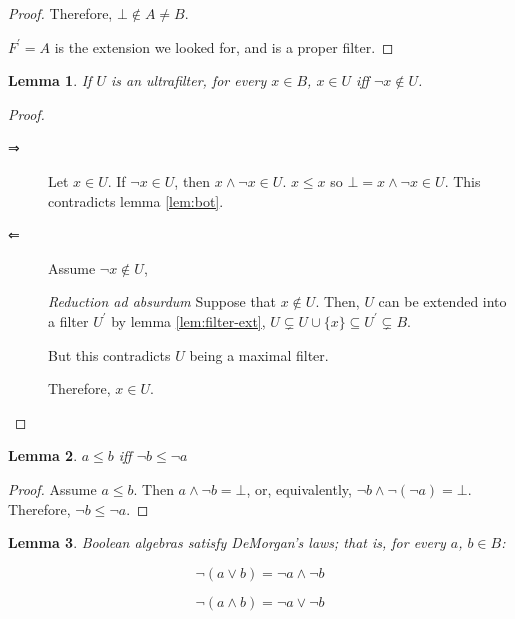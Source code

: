 \documentclass[notitlepage,a4paper]{article}
\newtheorem{lemma}{Lemma}
\begin{document}
\begin{enumerate}
\begin{proof}
           Therefore, $⊥ \not \in A ≠ B$.

           $F^\prime = A$ is the extension we looked for, and is a proper filter.
           
     \end{proof}
     
     \begin{lemma}\label{lem:neg}
       If $U$ is an ultrafilter, for every $x ∈ B$,
       $x ∈ U$ iff $¬x \not \in U$.
     \end{lemma}
     \begin{proof}

       \begin{description}
         
         \item[⇒] Let $x ∈ U$. If $¬x ∈ U$, then $x ∧ ¬x ∈ U$.
           $x ≤ x$ so $⊥ = x ∧ ¬x ∈ U$. This contradicts lemma \ref{lem:bot}.

         \item[⇐] Assume $¬x \not \in U$,

           {\em Reduction ad absurdum} Suppose that $x \not \in U$. Then,
           $U$ can be extended into a filter $U^\prime$ by lemma \ref{lem:filter-ext},
           $U \subsetneq U \cup \{x\} \subseteq U^\prime \subsetneq B$.
           
           But this contradicts $U$ being a maximal filter.
           
           Therefore, $x \in U$.
            
        \end{description}
    \end{proof}

     \begin{lemma}\label{lem:compl-rev}
       $a ≤ b$ iff $¬b ≤ ¬a$
     \end{lemma}
     \begin{proof}
       Assume $a ≤ b$. Then $a ∧ ¬b = ⊥$, or, equivalently,
       $¬b ∧ ¬(¬a) = ⊥$. Therefore, $¬b ≤ ¬a$.
     \end{proof}

     \begin{lemma}\label{lem:morgan}
       Boolean algebras satisfy DeMorgan's laws; that is, for every
       $a$, $b ∈ B$:

       $$¬(a ∨ b) = ¬a ∧ ¬b$$

       $$¬(a ∧ b) = ¬a ∨ ¬b$$
       
     \end{lemma}


\end{enumerate}
\end{document}
